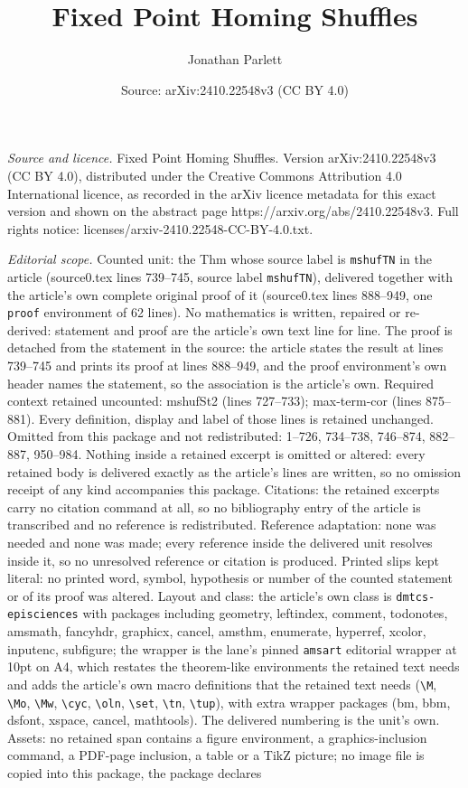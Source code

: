 \documentclass[10pt,a4paper]{amsart}
\title[Fixed Point Homing Shuffles]{Fixed Point Homing Shuffles}
\author{Jonathan Parlett}
\date{Source: arXiv:2410.22548v3 (CC BY 4.0)}
\begin{document}
\maketitle

\noindent\emph{Source and licence.} Fixed Point Homing Shuffles. Version arXiv:2410.22548v3 (CC BY 4.0), distributed under the Creative Commons Attribution 4.0 International licence, as recorded in the arXiv licence metadata for this exact version and shown on the abstract page https://arxiv.org/abs/2410.22548v3. Full rights notice: licenses/arxiv-2410.22548-CC-BY-4.0.txt.\par\smallskip

\noindent\textit{Editorial scope.} Counted unit: the Thm whose source label is \texttt{mshufTN} in the article (source0.tex lines 739--745, source label \texttt{mshufTN}), delivered together with the article's own complete original proof of it (source0.tex lines 888--949, one \texttt{proof} environment of 62 lines). No mathematics is written, repaired or re-derived: statement and proof are the article's own text line for line. The proof is detached from the statement in the source: the article states the result at lines 739--745 and prints its proof at lines 888--949, and the proof environment's own header names the statement, so the association is the article's own. Required context retained uncounted: mshufSt2 (lines 727--733); max-term-cor (lines 875--881). Every definition, display and label of those lines is retained unchanged. Omitted from this package and not redistributed: 1--726, 734--738, 746--874, 882--887, 950--984. Nothing inside a retained excerpt is omitted or altered: every retained body is delivered exactly as the article's lines are written, so no omission receipt of any kind accompanies this package. Citations: the retained excerpts carry no citation command at all, so no bibliography entry of the article is transcribed and no reference is redistributed. Reference adaptation: none was needed and none was made; every reference inside the delivered unit resolves inside it, so no unresolved reference or citation is produced. Printed slips kept literal: no printed word, symbol, hypothesis or number of the counted statement or of its proof was altered. Layout and class: the article's own class is \texttt{dmtcs-episciences} with packages including geometry, leftindex, comment, todonotes, amsmath, fancyhdr, graphicx, cancel, amsthm, enumerate, hyperref, xcolor, inputenc, subfigure; the wrapper is the lane's pinned \texttt{amsart} editorial wrapper at 10pt on A4, which restates the theorem-like environments the retained text needs and adds the article's own macro definitions that the retained text needs (\texttt{\textbackslash M}, \texttt{\textbackslash Mo}, \texttt{\textbackslash Mw}, \texttt{\textbackslash cyc}, \texttt{\textbackslash oln}, \texttt{\textbackslash set}, \texttt{\textbackslash tn}, \texttt{\textbackslash tup}), with extra wrapper packages (bm, bbm, dsfont, xspace, cancel, mathtools). The delivered numbering is the unit's own. Assets: no retained span contains a figure environment, a graphics-inclusion command, a PDF-page inclusion, a table or a TikZ picture; no image file is copied into this package, the package declares 
\end{document}

